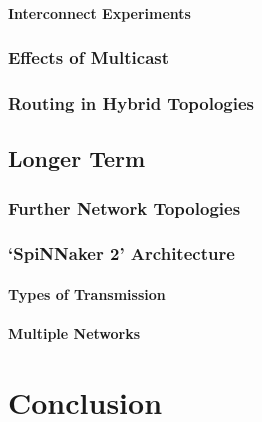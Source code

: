 \documentclass[a4paper,11pt,titlepage]{report}
\begin{document}
				\subsubsection{Interconnect Experiments}
			
			\subsection{Effects of Multicast}
			
			\subsection{Routing in Hybrid Topologies}
		
		\section{Longer Term}
			
			\subsection{Further Network Topologies}
			
			\subsection{`SpiNNaker 2' Architecture}
				
				\subsubsection{Types of Transmission}
				
				\subsubsection{Multiple Networks}
	
	
	\chapter{Conclusion}
	
\end{document}
